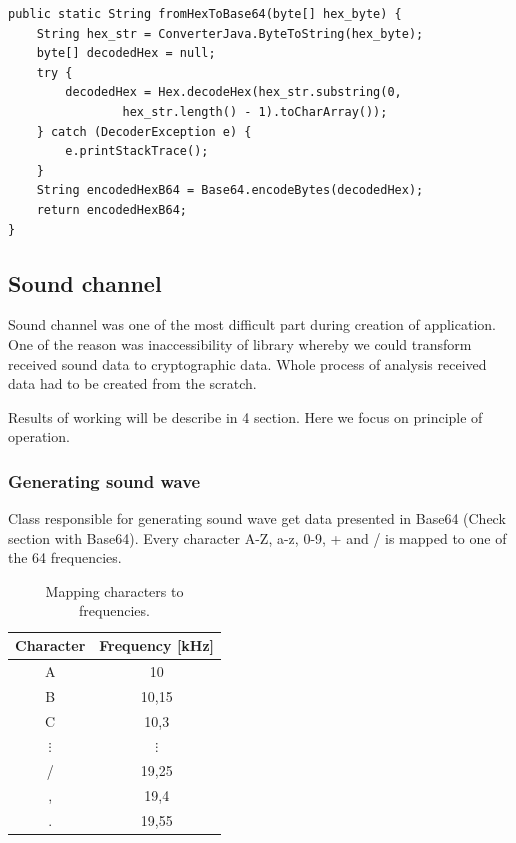 \documentclass[11pt,titlepage]{article}
\theoremstyle{plain}
\begin{document}
\begin{lstlisting}[caption={Example of code converting from Hex String to Base64 String}]
public static String fromHexToBase64(byte[] hex_byte) {
	String hex_str = ConverterJava.ByteToString(hex_byte);
	byte[] decodedHex = null;
	try {
		decodedHex = Hex.decodeHex(hex_str.substring(0,
				hex_str.length() - 1).toCharArray());
	} catch (DecoderException e) {
		e.printStackTrace();
	}
	String encodedHexB64 = Base64.encodeBytes(decodedHex);
	return encodedHexB64;
}
\end{lstlisting}

\subsection{Sound channel}

Sound channel was one of the most difficult part during creation of application. One of the reason was inaccessibility of library whereby we could transform received sound data to cryptographic data. Whole process of analysis received data had to be created from the scratch.  Results of working will be describe in 4 section. Here we focus on principle of operation.

\subsubsection{Generating sound wave}

Class responsible for generating sound wave get data presented in Base64 (Check section with Base64). Every character A-Z, a-z, 0-9, + and / is mapped to one of the 64 frequencies.
\begin{table}
	\centering
	\begin{tabular}{| c | c |}
		\hline
		Character & Frequency [kHz] \\
		\hline
		A & 10 \\
		\hline
		B & 10,15 \\
		\hline
		C & 10,3 \\
		\hline
		$\vdots$ & $\vdots$ \\
		\hline
		/ & 19,25 \\
		\hline
		, & 19,4 \\
		\hline
		. & 19,55 \\
		\hline
	\end{tabular}
	\caption{Mapping characters to frequencies.}
\end{table}
\end{document}
